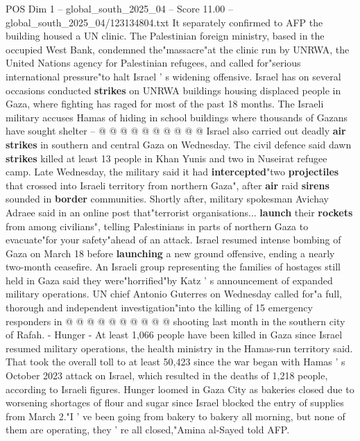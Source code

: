 \begin{textsample}{POS Dim 1 – global\_south\_2025\_04 – Score 11.00 – global\_south\_2025\_04/123134804.txt}
It separately confirmed to AFP the building housed a UN clinic.
The Palestinian foreign ministry, based in the occupied West Bank, condemned the"massacre"at the clinic run by UNRWA, the United Nations agency for Palestinian refugees, and called for"serious international pressure"to halt Israel ' s widening offensive.
Israel has on several occasions conducted \textbf{strikes} on UNRWA buildings housing displaced people in Gaza, where fighting has raged for most of the past 18 months.
The Israeli military accuses Hamas of hiding in school buildings where thousands of Gazans have sought shelter -- @ @ @ @ @ @ @ @ @ @ Israel also carried out deadly \textbf{air} \textbf{strikes} in southern and central Gaza on Wednesday.
The civil defence said dawn \textbf{strikes} killed at least 13 people in Khan Yunis and two in Nuseirat refugee camp.
Late Wednesday, the military said it had \textbf{intercepted}"two \textbf{projectiles} that crossed into Israeli territory from northern Gaza", after \textbf{air} raid \textbf{sirens} sounded in \textbf{border} communities.
Shortly after, military spokesman Avichay Adraee said in an online post that"terrorist organisations... \textbf{launch} their \textbf{rockets} from among civilians", telling Palestinians in parts of northern Gaza to evacuate"for your safety"ahead of an attack.
Israel resumed intense bombing of Gaza on March 18 before \textbf{launching} a new ground offensive, ending a nearly two-month ceasefire.
An Israeli group representing the families of hostages still held in Gaza said they were"horrified"by Katz ' s announcement of expanded military operations.
UN chief Antonio Guterres on Wednesday called for"a full, thorough and independent investigation"into the killing of 15 emergency responders in @ @ @ @ @ @ @ @ @ @ shooting last month in the southern city of Rafah. - Hunger - At least 1,066 people have been killed in Gaza since Israel resumed military operations, the health ministry in the Hamas-run territory said.
That took the overall toll to at least 50,423 since the war began with Hamas ' s October 2023 attack on Israel, which resulted in the deaths of 1,218 people, according to Israeli figures.
Hunger loomed in Gaza City as bakeries closed due to worsening shortages of flour and sugar since Israel blocked the entry of supplies from March 2."I ' ve been going from bakery to bakery all morning, but none of them are operating, they ' re all closed,"Amina al-Sayed told AFP.

\end{textsample}
